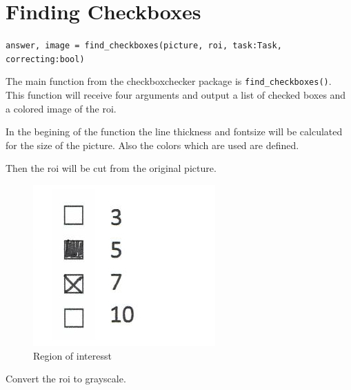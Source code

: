 \author{Florian Müller}
\section {Finding Checkboxes}

\texttt{answer, image = find\_checkboxes(picture, roi, task:Task, correcting:bool)}

The main function from the checkboxchecker package is \texttt{find\_checkboxes()}.
This function will receive four arguments and output a list of checked boxes and a colored image of the roi.

In the begining of the function the line thickness and fontsize will be calculated for the size of the picture.
Also the colors which are used are defined.

Then the roi will be cut from the original picture.

\begin{figure}[H]
    \centering
    \begin{minipage}[b]{.4\linewidth}
        \includegraphics[width=\linewidth]{src/chapters/developer/media/cbc_live/cbc_roim.png}
        \caption{Region of interesst}
    \end{minipage}
\end{figure}

Convert the roi to grayscale.

